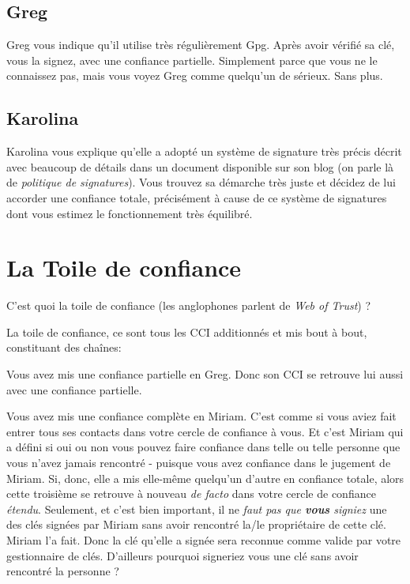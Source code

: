 \subsection{Greg}\label{greg}

Greg vous indique qu'il utilise très régulièrement Gpg. Après avoir
vérifié sa clé, vous la signez, avec une confiance
partielle. Simplement parce que vous ne le connaissez pas, mais vous
voyez Greg comme quelqu'un de sérieux. Sans plus.

\subsection{Karolina}\label{karolina}

Karolina vous explique qu'elle a adopté un système de signature très
précis décrit avec beaucoup de détails dans un document disponible sur
son blog (on parle là de \emph{politique de signatures}). Vous trouvez sa démarche très juste et décidez de lui accorder une
confiance totale, précisément à cause de ce système de signatures dont
vous estimez le fonctionnement très équilibré.

\section{La Toile de confiance}\label{la-toile-de-confiance}

C'est quoi la toile de confiance (les anglophones parlent de \emph{Web
of Trust}) ?

La toile de confiance, ce sont tous les CCI additionnés et mis bout à
bout, constituant des chaînes:

Vous avez mis une confiance partielle en Greg. Donc son CCI se retrouve
lui aussi avec une confiance partielle.

Vous avez mis une confiance complète en Miriam. C'est comme si vous
aviez fait entrer tous ses contacts dans votre cercle de confiance à
vous. Et c'est Miriam qui a défini si oui ou non vous pouvez faire
confiance dans telle ou telle personne que vous n'avez jamais rencontré
- puisque vous avez confiance dans le jugement de Miriam. Si, donc,
elle a mis elle-même quelqu'un d'autre en confiance totale, alors cette
troisième se retrouve à nouveau \emph{de facto} dans votre cercle de
confiance \emph{étendu}. Seulement, et c'est bien important, il ne \emph{faut pas que
\textbf{vous} signiez} une des clés signées par Miriam sans avoir
rencontré la/le propriétaire de cette clé. Miriam l'a fait. Donc la clé
qu'elle a signée sera reconnue comme valide par votre gestionnaire de
clés. D'ailleurs pourquoi signeriez vous une clé sans avoir rencontré
la personne ?

